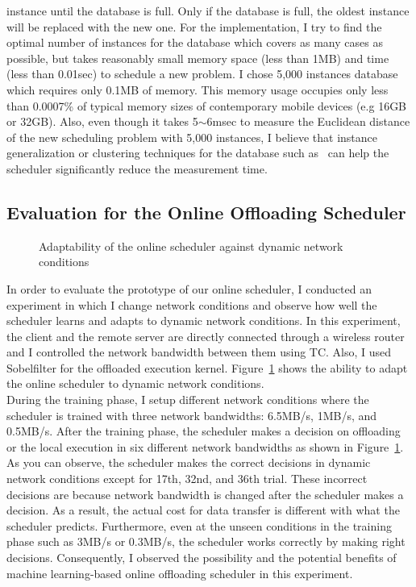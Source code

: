 instance until the database is full.
%
Only if the database is full, the oldest instance will be replaced with
the new one.
%
For the implementation, I try to find the optimal number of instances for
the database which covers as many cases as possible, but takes reasonably small 
memory space (less than 1MB) and time (less than 0.01sec) to schedule a
new problem.
%
I chose 5,000 instances database which requires only 0.1MB of memory.
%
This memory usage occupies only less than 0.0007\% of typical memory
sizes of
contemporary mobile devices (e.g 16GB or 32GB).
%
Also, even though it takes 5$\sim$6msec to measure the Euclidean
distance of the new scheduling problem with 5,000
instances, I believe that instance generalization or clustering techniques for
the database such as~\cite{domingos, chang} can help the
scheduler significantly reduce the measurement time. 
%

\subsection{Evaluation for the Online Offloading Scheduler}
\label{scheduler:online_eval}
%
\begin{figure}
\centering
{}
\caption{Adaptability of the online scheduler against dynamic network
conditions}
\label{fig:online}
\end{figure}

%
In order to evaluate the prototype of our online scheduler, I conducted
an experiment in which I change network conditions and observe how
well the scheduler learns and adapts to dynamic network conditions.
%
In this experiment, the client and the remote server are directly
connected through a wireless router and I controlled the network
bandwidth between them using TC.
%
Also, I used Sobelfilter for the offloaded execution kernel.
%
Figure~\ref{fig:online} shows the ability to adapt the online scheduler to dynamic
network conditions.\\
%
\indent During the training phase, I setup different network conditions where
the scheduler is trained with three network bandwidths: 6.5MB/s, 1MB/s,
and 0.5MB/s.
%
After the training phase, the scheduler makes a decision on offloading
or the local execution in six different network bandwidths as shown in
Figure~\ref{fig:online}.
%
As you can observe, the scheduler makes the correct decisions in dynamic
network conditions except for 17th, 32nd, and 36th trial.
%
These incorrect decisions are because network bandwidth is changed
after the scheduler makes a decision.
%
As a result, the actual cost for data transfer is different with what
the scheduler predicts. 
%
Furthermore, even at the unseen conditions in the training phase such as
3MB/s or 0.3MB/s, the scheduler works correctly by making right
decisions.
%
Consequently, I observed the possibility and the potential benefits of
machine learning-based online offloading scheduler in this experiment. 
%
